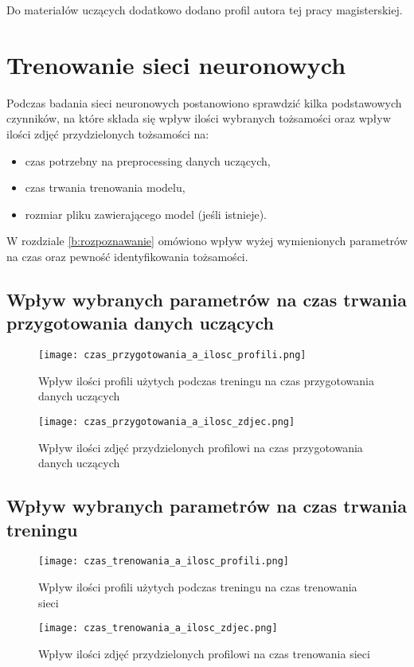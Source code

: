 Do materiałów uczących dodatkowo dodano profil autora tej pracy magisterskiej.

\section{Trenowanie sieci neuronowych}
Podczas badania sieci neuronowych postanowiono sprawdzić kilka podstawowych czynników, na które składa się wpływ ilości wybranych tożsamości oraz wpływ ilości zdjęć przydzielonych tożsamości na:
\begin{itemize}
\item czas potrzebny na preprocessing danych uczących,
\item czas trwania trenowania modelu,
\item rozmiar pliku zawierającego model (jeśli istnieje).
\end{itemize}
W rozdziale \ref{b:rozpoznawanie} omówiono wpływ wyżej wymienionych parametrów na czas oraz pewność identyfikowania tożsamości.

\subsection{Wpływ wybranych parametrów na czas trwania przygotowania danych uczących}
\begin{figure}[H]
	\centering
	\texttt{[image: czas\_przygotowania\_a\_ilosc\_profili.png]}
	\caption{Wpływ ilości profili użytych podczas treningu na czas przygotowania danych uczących}
	\label{fig:czas_p_profile}
\end{figure}

\begin{figure}[H]
	\centering
	\texttt{[image: czas\_przygotowania\_a\_ilosc\_zdjec.png]}
	\caption{Wpływ ilości zdjęć przydzielonych profilowi na czas przygotowania danych uczących}
	\label{fig:czas_p_zdjecia}
\end{figure}

\subsection{Wpływ wybranych parametrów na czas trwania treningu}
\begin{figure}[H]
	\centering
	\texttt{[image: czas\_trenowania\_a\_ilosc\_profili.png]}
	\caption{Wpływ ilości profili użytych podczas treningu na czas trenowania sieci}
	\label{fig:czas_t_profile}
\end{figure}

\begin{figure}[H]
	\centering
	\texttt{[image: czas\_trenowania\_a\_ilosc\_zdjec.png]}
	\caption{Wpływ ilości zdjęć przydzielonych profilowi na czas trenowania sieci}
	\label{fig:czas_t_zdjecia}
\end{figure}

